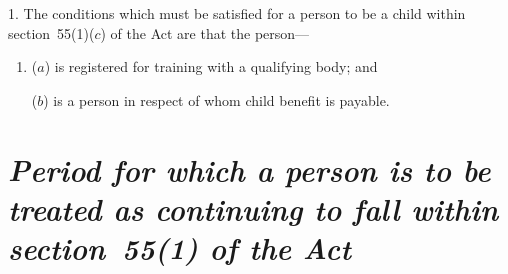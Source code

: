 \documentclass[12pt,a4paper]{article}
\begin{document}
%
%
%
%
%

1.  The conditions which must be satisfied for a person to be a child within section~55(1)($c$)  of the Act are that the person—
\begin{enumerate}\item[]
($a$) is registered for training with a qualifying body; and

($b$) is a person in respect of whom child benefit is payable.
\end{enumerate}


\section*{\itshape\sloppy Period for which a person is to be treated as continuing to fall within section~55(1) of the Act}
\end{document}
